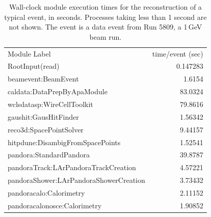 \documentclass[../main-v1.tex]{subfiles}
\begin{document}
\begin{longtable}
{l r}
\caption[Processing time for reconstruction modules for a  event]{Wall-clock module execution times for the reconstruction of a typical  event, in seconds.  Processes taking less than 1 second are not shown. The event is a data event from Run 5809, a 1\,GeV beam run.} \\ \toprowrule
  \rowcolor{dunesky}
Module Label & time/event (sec)\\ \toprowrule
RootInput(read)                          &     0.147283          \\
beamevent:BeamEvent                      &      1.6154           \\
caldata:DataPrepByApaModule              &      83.0324          \\
wclsdatasp:WireCellToolkit               &      79.8616          \\
gaushit:GausHitFinder                    &      1.56342          \\
reco3d:SpacePointSolver                  &      9.44157          \\
hitpdune:DisambigFromSpacePoints         &      1.52541          \\
pandora:StandardPandora                  &      39.8787          \\
pandoraTrack:LArPandoraTrackCreation     &      4.57221          \\
pandoraShower:LArPandoraShowerCreation   &      3.73432          \\
pandoracalo:Calorimetry                  &      2.11152          \\
pandoracalonosce:Calorimetry             &      1.90852          \\

\end{longtable}
\end{document}
